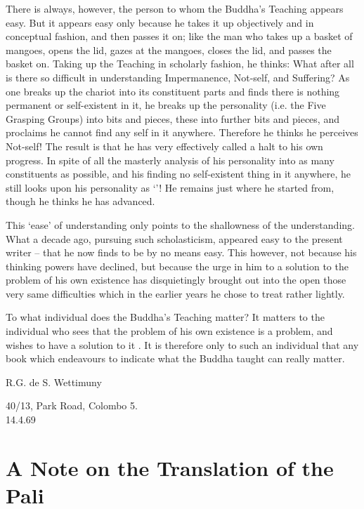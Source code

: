 There is always, however, the person to whom the Buddha's Teaching appears easy. But it appears easy only because he takes it up objectively and in conceptual fashion, and then passes it on; like the man who takes up a basket of mangoes, opens the lid, gazes at the mangoes, closes the lid, and passes the basket on. Taking up the Teaching in scholarly fashion, he thinks: What after all is there so difficult in understanding Impermanence, Not-self, and Suffering? As one breaks up the chariot into its constituent parts and finds there is nothing permanent or self-existent in it, he breaks up the personality (i.e. the Five Grasping Groups) into bits and pieces, these into further bits and pieces, and proclaims he cannot find any self in it anywhere. Therefore he thinks he perceives Not-self! The result is that he has very effectively called a halt to his own progress. In spite of all the masterly analysis of his personality into as many constituents as possible, and his finding no self-existent thing in it anywhere, he still looks upon his personality as `'! He remains just where he started from, though he thinks he has advanced.

This `ease' of understanding only points to the shallowness of the understanding. What a decade ago, pursuing such scholasticism, appeared easy to the present writer -- that he now finds to be by no means easy. This however, not because his thinking powers have declined, but because the urge in him to  a solution to the problem of his own existence has disquietingly brought out into the open those very same difficulties which in the earlier years he chose to treat rather lightly.

To what individual does the Buddha's Teaching matter? It matters to the individual who sees that the problem of his own existence is a  problem, and wishes to have a solution to it . It is therefore only to such an individual that any book which endeavours to indicate what the Buddha taught can really matter.

R.G. de S. Wettimuny

40/13, Park Road, Colombo 5.\\
14.4.69

\clearpage

\section{A Note on the Translation of the Pali}

